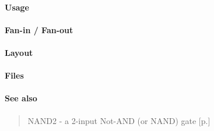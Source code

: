 \paragraph{Usage}

\paragraph{Fan-in / Fan-out}

\paragraph{Layout}

\paragraph{Files}

\paragraph{See also}
\begin{quote}
    NAND2 - a 2-input Not-AND (or NAND) gate [p.\pageref{NAND2}]
\end{quote}
